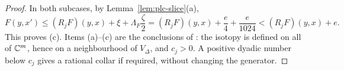 \begin{proof}
In both subcases, by Lemma~\ref{lem:plc-slice}(a),
\[
 F(y,x')\le(R_jF)(y,x)+\xi+\Lambda_F\frac\zeta2=(R_jF)(y,x)+\frac e4+\frac e{1024}<(R_jF)(y,x)+e .
\]
This proves (c). Items (a)--(c) are the conclusions of : the isotopy is defined on all
of $\mathbb{C}^m$, hence on a neighbourhood of $V_\Delta$, and $c_j>0$. A positive dyadic number below $c_j$ gives a rational collar if required, without changing the generator.
\end{proof}

